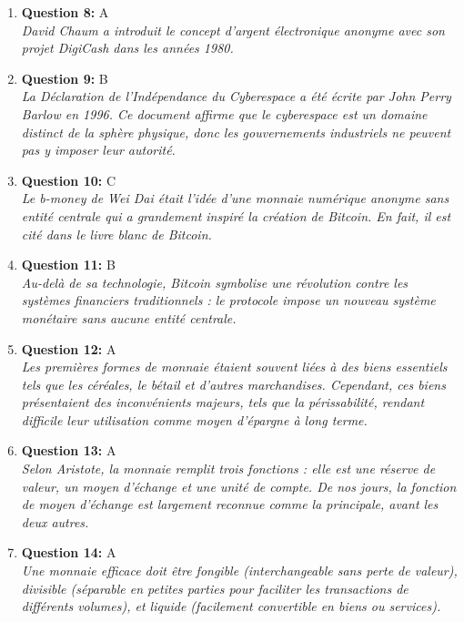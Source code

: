 \documentclass[12pt,a4paper]{article}
\begin{document}
\begin{enumerate}
\item \textbf{Question 8:} A
\\ \textit{David Chaum a introduit le concept d'argent électronique anonyme avec son projet DigiCash dans les années 1980.}

\item \textbf{Question 9:} B
\\ \textit{La Déclaration de l'Indépendance du Cyberespace a été écrite par John Perry Barlow en 1996. Ce document affirme que le cyberespace est un domaine distinct de la sphère physique, donc les gouvernements industriels ne peuvent pas y imposer leur autorité.}

\item \textbf{Question 10:} C
\\ \textit{Le b-money de Wei Dai était l'idée d'une monnaie numérique anonyme sans entité centrale qui a grandement inspiré la création de Bitcoin. En fait, il est cité dans le livre blanc de Bitcoin.}

\item \textbf{Question 11:} B
\\ \textit{Au-delà de sa technologie, Bitcoin symbolise une révolution contre les systèmes financiers traditionnels : le protocole impose un nouveau système monétaire sans aucune entité centrale.}

\item \textbf{Question 12:} A
\\ \textit{Les premières formes de monnaie étaient souvent liées à des biens essentiels tels que les céréales, le bétail et d'autres marchandises. Cependant, ces biens présentaient des inconvénients majeurs, tels que la périssabilité, rendant difficile leur utilisation comme moyen d'épargne à long terme.}

\item \textbf{Question 13:} A
\\ \textit{Selon Aristote, la monnaie remplit trois fonctions : elle est une réserve de valeur, un moyen d'échange et une unité de compte. De nos jours, la fonction de moyen d'échange est largement reconnue comme la principale, avant les deux autres.}

\item \textbf{Question 14:} A
\\ \textit{Une monnaie efficace doit être fongible (interchangeable sans perte de valeur), divisible (séparable en petites parties pour faciliter les transactions de différents volumes), et liquide (facilement convertible en biens ou services).}


\end{enumerate}
\end{document}
